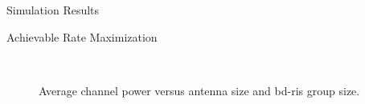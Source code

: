 \documentclass[journal]{IEEEtran}
\begin{document}
\begin{section}{Simulation Results}
\begin{subsection}{Achievable Rate Maximization}
		\begin{figure}[!t]
			\centering
			\\
			\caption{
				Average channel power versus antenna size and \gls{bd}-\gls{ris} group size.
			}
			\label{fg:rate}
		\end{figure}
	\end{subsection}


\end{section}
\end{document}

